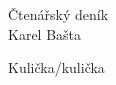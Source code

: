 \documentclass[a4paper,12pt]{article}
\begin{document}
    \begin{titlepage}\centering
        \vspace*{\fill}
        \Huge Čtenářský deník\\
        \Large Karel Bašta
        \vspace*{\fill}
    \end{titlepage}

    \renewcommand\contentsname{Obsah}
    \tableofcontents %
    \thispagestyle{empty}
    \newpage

     {Kulička/kulička}
\end{document}
